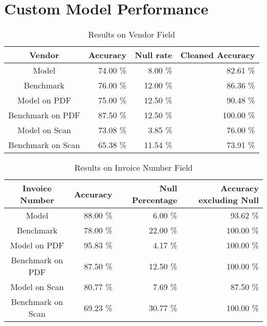 \newpage
\section{Custom Model Performance}

\begin{table}[ht]   %
    \centering
    \footnotesize
    \begin{tabular}{c|rrr} %
        \toprule    %
        Vendor  & Accuracy  & Null rate & Cleaned Accuracy \\
        \midrule    %
        Model               & 74.00 \%   & 8.00 \%   & 82.61 \% \\
        Benchmark           & 76.00 \%   & 12.00 \%  & 86.36 \%\\
        \midrule    %
        Model on PDF        & 75.00 \%   & 12.50 \%  & 90.48 \% \\
        Benchmark on PDF    & 87.50 \%   & 12.50 \%  & 100.00 \% \\
        \midrule    %
        Model on Scan       & 73.08 \%  & 3.85 \%   & 76.00 \% \\
        Benchmark on Scan   & 65.38 \%  & 11.54 \%  & 73.91 \% \\

        \bottomrule %
    \end{tabular}
    \caption{Results on Vendor Field}
    \label{table:Model_Bench_Vendor}
\end{table}
\begin{table}[ht]   %
    \centering
    \footnotesize
    \begin{tabular}{c|rrr} %
        \toprule    %
        Invoice Number  & Accuracy  & Null Percentage & Accuracy excluding Null \\
        \midrule    %
        Model               & 88.00 \%   & 6.00 \%   & 93.62 \% \\
        Benchmark           & 78.00 \%   & 22.00 \%  & 100.00 \%\\
        \midrule    %
        Model on PDF        & 95.83 \%   & 4.17 \%  & 100.00 \% \\
        Benchmark on PDF    & 87.50 \%   & 12.50 \%  & 100.00 \% \\
        \midrule    %
        Model on Scan       & 80.77 \%  & 7.69 \%   & 87.50 \% \\
        Benchmark on Scan   & 69.23 \%  & 30.77 \%  & 100.00 \% \\

        \bottomrule %
    \end{tabular}
    \caption{Results on Invoice Number Field}
    \label{table:Model_Bench_Number}
\end{table}
